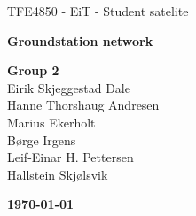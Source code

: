 \begin{titlepage}
\begin{center}

\vspace*{6cm}
{\Huge TFE4850 - EiT - Student satelite}

\vspace*{0.5cm}
{\LARGE\textbf{Groundstation network}}

\vspace*{0.7cm}
{\Large
	\textbf{Group 2}\\
	Eirik Skjeggestad Dale\\
	Hanne Thorshaug Andresen\\
	Marius Ekerholt\\
	Børge Irgens\\
	Leif-Einar H. Pettersen\\
	Hallstein Skjølsvik
}

{\vfill\textbf{\today}}

\end{center}
\end{titlepage}